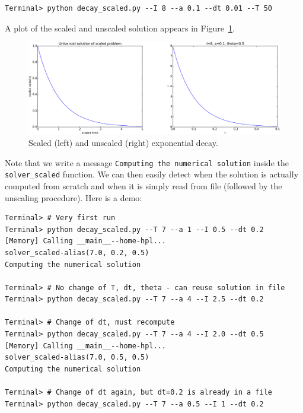 \documentclass[graybox,envcountchap,sectrefs,final]{svmonodo}
\begin{document}
\begin{Verbatim}[frame=lines,label=\fbox{{\tiny Terminal}},framesep=2.5mm,framerule=0.7pt,fontsize=\fontsize{9pt}{9pt}]
Terminal> python decay_scaled.py --I 8 --a 0.1 --dt 0.01 --T 50
\end{Verbatim}
A plot of the scaled and unscaled solution appears in Figure~\ref{sec:decay:fig:simplest}.


\begin{figure}[!ht]  %
  \centerline{\includegraphics[width=1.0\linewidth]{fig-scaling/decay.pdf}}
  \caption{
  Scaled (left) and unscaled (right) exponential decay. \label{sec:decay:fig:simplest}
  }
\end{figure}



Note that we write a message \texttt{Computing the numerical solution} inside
the \Verb!solver_scaled! function. We can then easily detect when
the solution is actually computed from scratch
and when it is simply read from file (followed by the unscaling procedure).
Here is a demo:

\begin{Verbatim}[frame=lines,label=\fbox{{\tiny Terminal}},framesep=2.5mm,framerule=0.7pt,fontsize=\fontsize{9pt}{9pt}]
Terminal> # Very first run
Terminal> python decay_scaled.py --T 7 --a 1 --I 0.5 --dt 0.2
[Memory] Calling __main__--home-hpl...
solver_scaled-alias(7.0, 0.2, 0.5)
Computing the numerical solution

Terminal> # No change of T, dt, theta - can reuse solution in file
Terminal> python decay_scaled.py --T 7 --a 4 --I 2.5 --dt 0.2

Terminal> # Change of dt, must recompute
Terminal> python decay_scaled.py --T 7 --a 4 --I 2.0 --dt 0.5
[Memory] Calling __main__--home-hpl...
solver_scaled-alias(7.0, 0.5, 0.5)
Computing the numerical solution

Terminal> # Change of dt again, but dt=0.2 is already in a file
Terminal> python decay_scaled.py --T 7 --a 0.5 --I 1 --dt 0.2
\end{Verbatim}
\end{document}
